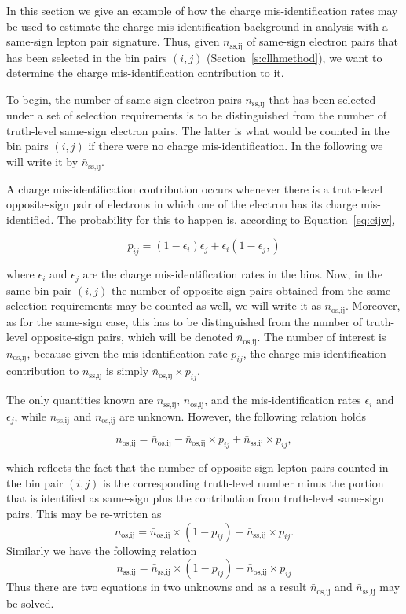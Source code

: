 In this section we give an example of how the charge mis-identification rates
may be used to estimate the charge mis-identification background in analysis
with a same-sign lepton pair signature. Thus, given $n_{\text{ss,ij}}$ of
same-sign electron pairs that has been selected in the bin pairs $(i,j)$
(Section~\ref{s:cllhmethod}), we want to determine the charge
mis-identification contribution to it.


To begin, the number of same-sign electron pairs $n_{\text{ss,ij}}$ that has
been selected under a set of selection requirements is to be distinguished from
the number of truth-level same-sign electron pairs. The latter is what would be
counted in the bin pairs $(i,j)$ if there were no charge mis-identification. In
the following we will write it by $\bar{n}_{\text{ss,ij}}$.

A charge mis-identification contribution occurs whenever there is a truth-level
opposite-sign pair of electrons in which one of the electron has its charge
mis-identified. The probability for this to happen is, according to
Equation~\ref{eq:cijw},

$$p_{ij} = (1-\epsilon_i)\epsilon_j +  \epsilon_i(1-\epsilon_j,)$$

where $\epsilon_i$ and $\epsilon_j$ are the charge mis-identification rates in
the bins. Now, in the same bin pair $(i,j)$ the number of opposite-sign pairs
obtained from the same selection requirements may be counted as well, we will write
it as $n_{\text{os,ij}}$. Moreover, as for the same-sign case, this has to be
distinguished from the number of truth-level opposite-sign pairs, which will be
denoted $\bar{n}_{\text{os,ij}}$. The number of interest is
$\bar{n}_{\text{os,ij}}$, because given the mis-identification rate $p_{ij}$,
the charge mis-identification contribution to $n_{\text{ss,ij}}$ is simply
$\bar{n}_{\text{os,ij}}\times p_{ij}$.


The only quantities known are $n_{\text{ss,ij}}$, $n_{\text{os,ij}}$, and the
mis-identification rates $\epsilon_i$ and $\epsilon_j$, while
$\bar{n}_{\text{ss,ij}}$ and $\bar{n}_{\text{os,ij}}$ are unknown. However, the
following relation holds

$$n_{\text{os,ij}} = \bar{n}_{\text{os,ij}} - \bar{n}_{\text{os,ij}}\times
	p_{ij} + \bar{n}_{\text{ss,ij}}\times p_{ij},$$

which reflects the fact that the number of opposite-sign lepton pairs counted
in the bin pair $(i,j)$ is the corresponding truth-level number minus the portion
that is identified as same-sign plus the contribution from truth-level same-sign
pairs. This may be re-written as
$$ n_{\text{os,ij}} = \bar{n}_{\text{os,ij}}\times (1 - p_{ij}) +
	\bar{n}_{\text{ss,ij}} \times p_{ij}. $$
Similarly we have the following relation
$$ n_{\text{ss,ij}} = \bar{n}_{\text{ss,ij}}\times (1 - p_{ij}) +
	\bar{n}_{\text{os,ij}} \times p_{ij} $$
Thus there are two equations in two unknowns and as a result
$\bar{n}_{\text{os,ij}}$ and $\bar{n}_{\text{ss,ij}}$ may be solved.

